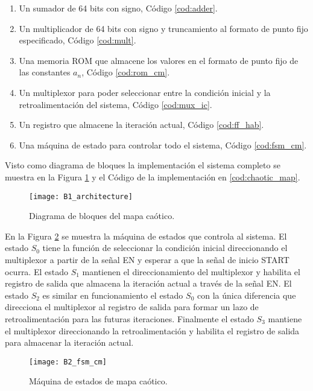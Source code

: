         \begin{enumerate}
            \item Un sumador de 64 bits con signo, Código \ref{cod:adder}.
            \item Un multiplicador de 64 bits con signo y truncamiento al formato de punto fijo especificado, Código \ref{cod:mult}.
            \item Una memoria ROM que almacene los valores en el formato de punto fijo de las constantes $a_{n}$, Código \ref{cod:rom_cm}.
            \item Un multiplexor para poder seleccionar entre la condición inicial y la retroalimentación del sistema, Código \ref{cod:mux_ic}.
            \item Un registro que almacene la iteración actual, Código \ref{cod:ff_hab}.
            \item Una máquina de estado para controlar todo el sistema, Código \ref{cod:fsm_cm}.            
        \end{enumerate}
    
        Visto como diagrama de bloques la implementación el sistema completo se muestra en la Figura \ref{fig:B1_architecture} y el Código de la implementación en \ref{cod:chaotic_map}.
        
        \begin{figure}[hbtp]
            \centering
            \texttt{[image: B1\_architecture]}
            \caption{Diagrama de bloques del mapa caótico.}
            \label{fig:B1_architecture}
        \end{figure}

        En la Figura \ref{fig:B2_fsm_cm} se muestra la máquina de estados que controla al sistema. El estado $S_{0}$ tiene la función de seleccionar la condición inicial direccionando el multiplexor a partir de la señal EN y esperar a que la señal de inicio START ocurra. El estado $S_{1}$ mantienen el direccionamiento del multiplexor y habilita el registro de salida que almacena la iteración actual a través de la señal EN. El estado $S_{2}$ es similar en funcionamiento el estado $S_{0}$ con la única diferencia que direcciona el multiplexor al registro de salida para formar un lazo de retroalimentación para las futuras iteraciones. Finalmente el estado $S_{3}$ mantiene el multiplexor direccionando la retroalimentación y habilita el registro de salida para almacenar la iteración actual. 

        \begin{figure}[hbtp]
            \centering
            \texttt{[image: B2\_fsm\_cm]}
            \caption{Máquina de estados de mapa caótico.}
            \label{fig:B2_fsm_cm}
        \end{figure}


